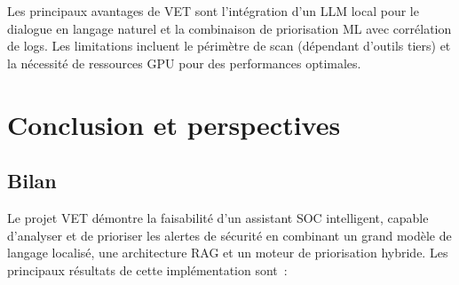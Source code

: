 \documentclass[runningheads]{llncs}
\begin{document}
Les principaux avantages de VET sont l'intégration d'un LLM local pour le dialogue en langage naturel et la combinaison de priorisation ML avec corrélation de logs. Les limitations incluent le périmètre de scan (dépendant d'outils tiers) et la nécessité de ressources GPU pour des performances optimales.


\section{Conclusion et perspectives}

\subsection{Bilan}

Le projet VET démontre la faisabilité d'un assistant SOC intelligent, capable d'analyser et de prioriser les alertes de sécurité en combinant un grand modèle de langage localisé, une architecture RAG et un moteur de priorisation hybride. Les principaux résultats de cette implémentation sont~:
\end{document}
